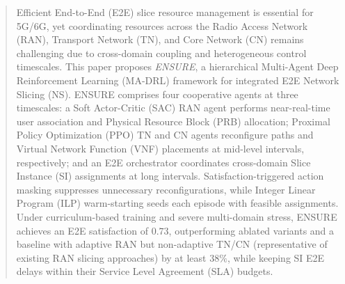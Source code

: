 \documentclass[12pt,lettersize,journal,onecolumn]{IEEEtran}
\begin{document}
\maketitle
\begin{abstract}
Efficient End-to-End (E2E) slice resource management is essential for 5G/6G, yet coordinating resources across the Radio Access Network (RAN), Transport Network (TN), and Core Network (CN) remains challenging due to cross-domain coupling and heterogeneous control timescales. This paper proposes \textit{ENSURE}, a hierarchical Multi-Agent Deep Reinforcement Learning (MA-DRL) framework for integrated E2E Network Slicing (NS). ENSURE comprises four cooperative agents at three timescales: a Soft Actor-Critic (SAC) RAN agent performs near-real-time user association and Physical Resource Block (PRB) allocation; Proximal Policy Optimization (PPO) TN and CN agents reconfigure paths and Virtual Network Function (VNF) placements at mid-level intervals, respectively; and an E2E orchestrator coordinates cross-domain Slice Instance (SI) assignments at long intervals. Satisfaction-triggered action masking suppresses unnecessary reconfigurations, while Integer Linear Program (ILP) warm-starting seeds each episode with feasible assignments. Under curriculum-based training and severe multi-domain stress, ENSURE achieves an E2E satisfaction of $0.73$, outperforming ablated variants and a baseline with adaptive RAN but non-adaptive TN/CN (representative of existing RAN slicing approaches) by at least $38\%$, while keeping SI E2E delays within their Service Level Agreement (SLA) budgets.


\end{abstract}
\end{document}
